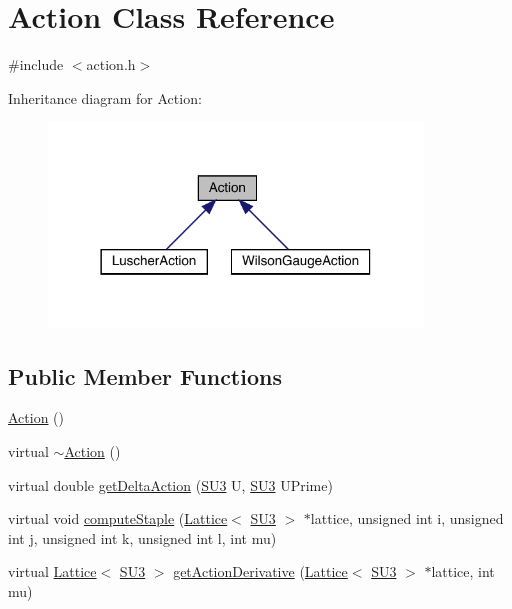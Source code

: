 \hypertarget{class_action}{}\section{Action Class Reference}
\label{class_action}


{\ttfamily \#include $<$action.\+h$>$}



Inheritance diagram for Action\+:\nopagebreak
\begin{figure}[H]
\begin{center}
\leavevmode
\includegraphics[width=282pt]{class_action__inherit__graph}
\end{center}
\end{figure}
\subsection*{Public Member Functions}
\begin{DoxyCompactItemize}
\item 
\mbox{\hyperlink{class_action_a4f457ccfc8336b565cadca56b36e0271}{Action}} ()
\item 
virtual \mbox{\hyperlink{class_action_acdb06775d157339256a8ecd55749226c}{$\sim$\+Action}} ()
\item 
virtual double \mbox{\hyperlink{class_action_a9409aad86cbfe3b6ec25bf5a837eaea5}{get\+Delta\+Action}} (\mbox{\hyperlink{class_s_u3}{S\+U3}} U, \mbox{\hyperlink{class_s_u3}{S\+U3}} U\+Prime)
\item 
virtual void \mbox{\hyperlink{class_action_a2d5a64b47a8913955e5911ca072ff80d}{compute\+Staple}} (\mbox{\hyperlink{class_lattice}{Lattice}}$<$ \mbox{\hyperlink{class_s_u3}{S\+U3}} $>$ $\ast$lattice, unsigned int i, unsigned int j, unsigned int k, unsigned int l, int mu)
\item 
virtual \mbox{\hyperlink{class_lattice}{Lattice}}$<$ \mbox{\hyperlink{class_s_u3}{S\+U3}} $>$ \mbox{\hyperlink{class_action_a78168dd7c3819a3365e28fc1aae1b9b6}{get\+Action\+Derivative}} (\mbox{\hyperlink{class_lattice}{Lattice}}$<$ \mbox{\hyperlink{class_s_u3}{S\+U3}} $>$ $\ast$lattice, int mu)
\end{DoxyCompactItemize}
